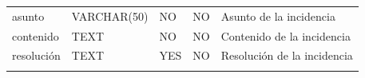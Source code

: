 \documentclass[12pt,a4paperpaper,]{report}
\begin{document}
\begin{longtable}[]{@{}lllll@{}}
\begin{minipage}[t]{0.21\columnwidth}\raggedright\strut
asunto\strut
\end{minipage} & \begin{minipage}[t]{0.19\columnwidth}\raggedright\strut
VARCHAR(50)\strut
\end{minipage} & \begin{minipage}[t]{0.16\columnwidth}\raggedright\strut
NO\strut
\end{minipage} & \begin{minipage}[t]{0.19\columnwidth}\raggedright\strut
NO\strut
\end{minipage} & \begin{minipage}[t]{0.11\columnwidth}\raggedright\strut
Asunto de la incidencia\strut
\end{minipage}\tabularnewline
\begin{minipage}[t]{0.21\columnwidth}\raggedright\strut
contenido\strut
\end{minipage} & \begin{minipage}[t]{0.19\columnwidth}\raggedright\strut
TEXT\strut
\end{minipage} & \begin{minipage}[t]{0.16\columnwidth}\raggedright\strut
NO\strut
\end{minipage} & \begin{minipage}[t]{0.19\columnwidth}\raggedright\strut
NO\strut
\end{minipage} & \begin{minipage}[t]{0.11\columnwidth}\raggedright\strut
Contenido de la incidencia\strut
\end{minipage}\tabularnewline
\begin{minipage}[t]{0.21\columnwidth}\raggedright\strut
resolución\strut
\end{minipage} & \begin{minipage}[t]{0.19\columnwidth}\raggedright\strut
TEXT\strut
\end{minipage} & \begin{minipage}[t]{0.16\columnwidth}\raggedright\strut
YES\strut
\end{minipage} & \begin{minipage}[t]{0.19\columnwidth}\raggedright\strut
NO\strut
\end{minipage} & \begin{minipage}[t]{0.11\columnwidth}\raggedright\strut
Resolución de la incidencia\strut
\end{minipage}\tabularnewline
\begin{minipage}[t]{0.21\columnwidth}\raggedright\strut

\end{minipage}
\end{longtable}
\end{document}
